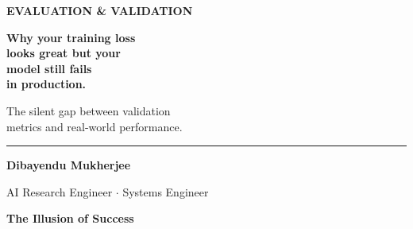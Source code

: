 \documentclass[11pt]{article}
\begin{document}
\thispagestyle{empty}
\vspace*{0.3in}

\begin{center}

    {\fontsize{14}{16}\selectfont\color{brandblue}\textbf{
    EVALUATION \& VALIDATION
    }}

    \vspace{0.5in}

    {\fontsize{40}{48}\selectfont\color{brandnavy}\bfseries
Why your training loss\\[0.15in]
looks great but your\\[0.25in]
model still fails\\[0.15in]
in production.
}

    \vspace{0.6in}

    {\fontsize{18}{24}\selectfont\color{brandgray}
    The silent gap between validation\\
    metrics and real-world performance.
    }

    \vfill

    \begin{minipage}{0.8\textwidth}
        \centering
        \rule{0.6\linewidth}{0.5pt}

        \vspace{0.2in}

        {\fontsize{12}{14}\selectfont\color{brandnavy}
        \textbf{Dibayendu Mukherjee}
        }

        \vspace{0.05in}

        {\fontsize{10}{12}\selectfont\color{brandgray}
        AI Research Engineer \quad $\cdot$ \quad Systems Engineer
        }

    \end{minipage}

\end{center}

\newpage

\vspace*{0.4in}

\begin{center}
{\fontsize{26}{30}\selectfont\color{brandnavy}\bfseries 
The Illusion of Success}
\end{center}
\end{document}
